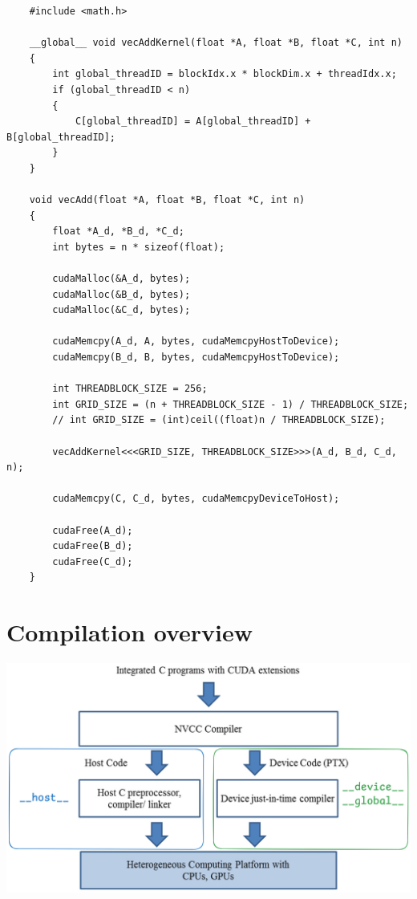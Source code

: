 \begin{code}
    \label{code:dp_kernel_call}
    \begin{verbatim}
    #include <math.h>

    __global__ void vecAddKernel(float *A, float *B, float *C, int n)
    {
        int global_threadID = blockIdx.x * blockDim.x + threadIdx.x;
        if (global_threadID < n)
        {
            C[global_threadID] = A[global_threadID] + B[global_threadID];
        }
    }

    void vecAdd(float *A, float *B, float *C, int n)
    {
        float *A_d, *B_d, *C_d;
        int bytes = n * sizeof(float);

        cudaMalloc(&A_d, bytes);
        cudaMalloc(&B_d, bytes);
        cudaMalloc(&C_d, bytes);

        cudaMemcpy(A_d, A, bytes, cudaMemcpyHostToDevice);
        cudaMemcpy(B_d, B, bytes, cudaMemcpyHostToDevice);

        int THREADBLOCK_SIZE = 256;
        int GRID_SIZE = (n + THREADBLOCK_SIZE - 1) / THREADBLOCK_SIZE;
        // int GRID_SIZE = (int)ceil((float)n / THREADBLOCK_SIZE);

        vecAddKernel<<<GRID_SIZE, THREADBLOCK_SIZE>>>(A_d, B_d, C_d, n);

        cudaMemcpy(C, C_d, bytes, cudaMemcpyDeviceToHost);

        cudaFree(A_d);
        cudaFree(B_d);
        cudaFree(C_d);
    }
    \end{verbatim}
\end{code}
\section{Compilation overview}
\begin{center}
    \includegraphics[width=0.7\linewidth]{Images/DP/compilation.png}
\end{center}
\pagebreak